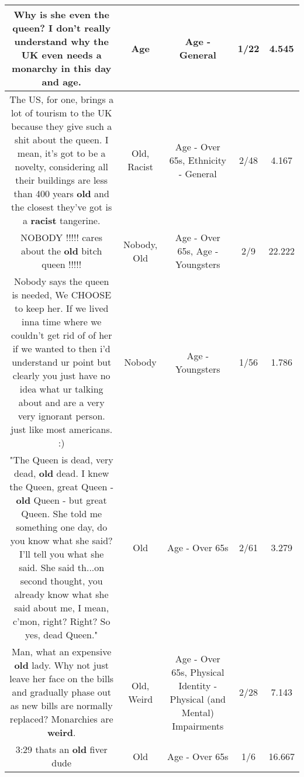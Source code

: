 \documentclass[11pt]{article}
\newlength\mylength
\begin{document}
\begin{center}
\begin{longtable}{|C{.65\mylength}|C{.30\mylength}|C{.12\mylength}|C{.12\mylength}|C{.12\mylength}|}
  \small Why is she even the queen? I don't really understand why the UK even needs a monarchy in this day and \textbf{age}.\normalsize   & Age & Age - General & 1/22 & 4.545 \\  \hline
  \small The US, for one, brings a lot of tourism to the UK because they give such a shit about the queen. I mean, it's got to be a novelty, considering all their buildings are less than 400 years \textbf{old} and the closest they've got is a \textbf{racist} tangerine.\normalsize   & Old, Racist & Age - Over 65s, Ethnicity - General & 2/48 & 4.167 \\  \hline
  \small NOBODY !!!!! cares about the \textbf{old} bitch queen !!!!!\normalsize   & Nobody, Old & Age - Over 65s, Age - Youngsters & 2/9 & 22.222 \\  \hline
  \small Nobody says the queen is needed, We CHOOSE to keep her. If we lived inna time where we couldn't get rid of of her if we wanted to then i'd understand ur point but clearly you just have no idea what ur talking about and are a very very ignorant person. just like most americans. :)\normalsize   & Nobody & Age - Youngsters & 1/56 & 1.786 \\  \hline
  \small "The Queen is dead, very dead, \textbf{old} dead. I knew the Queen, great Queen - \textbf{old} Queen - but great Queen. She told me something one day, do you know what she said? I'll tell you what she said. She said th...on second thought, you already know what she said about me, I mean, c'mon, right? Right? So yes, dead Queen."\normalsize   & Old & Age - Over 65s & 2/61 & 3.279 \\  \hline
  \small Man, what an expensive \textbf{old} lady. Why not just leave her face on the bills and gradually phase out as new bills are normally replaced? Monarchies are \textbf{weird}.\normalsize   & Old, Weird & Age - Over 65s, Physical Identity - Physical (and Mental) Impairments & 2/28 & 7.143 \\  \hline
  \small 3:29 thats an \textbf{old} fiver dude\normalsize   & Old & Age - Over 65s & 1/6 & 16.667 \\  \hline

\end{longtable}
\end{center}
\end{document}
